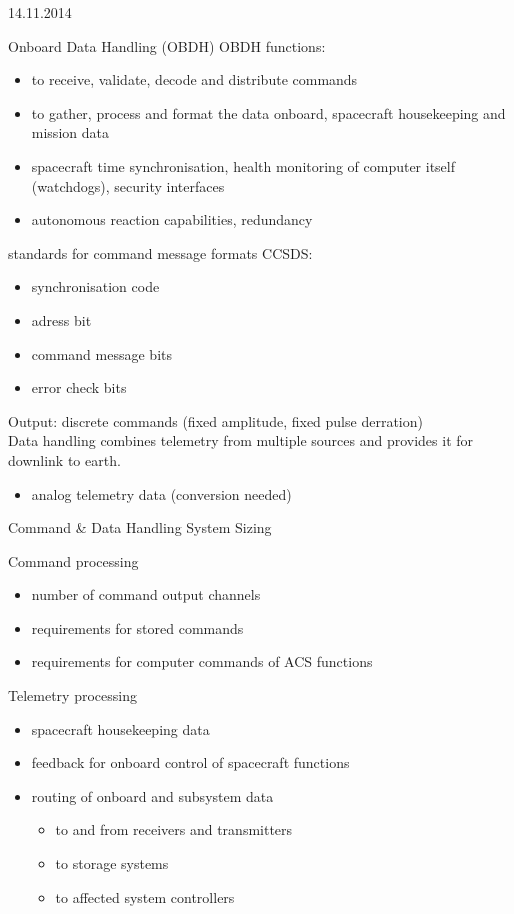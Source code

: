 \begin{chapter}{14.11.2014}
 \begin{section}{Onboard Data Handling (OBDH)}
  OBDH functions:
  \begin{itemize}
   \item to receive, validate, decode and distribute commands
   \item to gather, process and format the data onboard, spacecraft housekeeping and mission data
   \item spacecraft time synchronisation, health monitoring of computer itself (watchdogs), security interfaces
   \item autonomous reaction capabilities, redundancy
  \end{itemize}
  
  standards for command message formats CCSDS:
  \begin{itemize}
   \item synchronisation code
   \item adress bit
   \item command message bits
   \item error check bits
  \end{itemize}

  Output: discrete commands (fixed amplitude, fixed pulse derration)\\
  Data handling combines telemetry from multiple sources and provides it for downlink to earth.
  \begin{itemize}
   \item analog telemetry data (conversion needed)
  \end{itemize}
  
  \end{section}
  
  \begin{section}{Command \& Data Handling System Sizing}
  
  Command processing
  \begin{itemize}
   \item number of command output channels
   \item requirements for stored commands
   \item requirements for computer commands of ACS functions
  \end{itemize}
  Telemetry processing
  \begin{itemize}
   \item spacecraft housekeeping data
   \item feedback for onboard control of spacecraft functions
   \item routing of onboard and subsystem data \begin{itemize}
                                                \item to and from receivers and transmitters
                                                \item to storage systems
                                                \item to affected system controllers
                                               \end{itemize}


\end{itemize}
\end{section}
\end{chapter}
